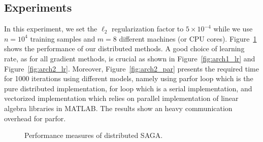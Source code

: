 \documentclass[a4paper,11pt]{article}
\newcommand{\figref}[1]{Figure~\ref{fig:#1}}
\begin{document}
\subsection{Experiments}

In this experiment, we set the $\ell_2$ regularization factor to $5\times
10^{-4}$ while we use $n=10^4$ training samples and $m=8$ different machines (or
CPU cores). \figref{distributed_perf} shows the performance of our distributed
methods. A good choice of learning rate, as for all gradient methods, is crucial
as shown in \figref{arch1_lr} and \figref{arch2_lr}. Moreover,
\figref{arch2_par} presents the required time for 1000 iterations using
different models, namely using parfor loop which is the pure distributed
implementation, for loop which is a serial implementation, and vectorized
implementation which relies on parallel implementation of linear algebra
libraries in MATLAB. The results show an heavy communication overhead for
parfor.

\begin{figure}[ht]
	\centering
	\hspace{0pt}
	\hspace{0pt}
	\caption{Performance measures of distributed SAGA.}
	\label{fig:distributed_perf}
\end{figure}
\end{document}
